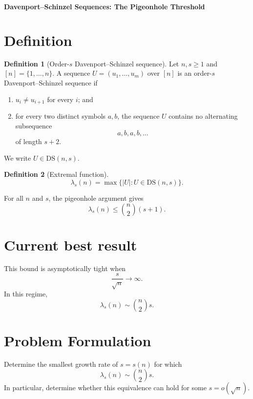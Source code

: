 \documentclass[11pt,a4paper]{article}
\theoremstyle{definition}
\newtheorem{definition}{Definition}
\begin{document}
\begin{center}
  {\Large\bfseries Davenport--Schinzel Sequences: The Pigeonhole Threshold}
\end{center}

\section{Definition}
\begin{definition}[Order-$s$ Davenport--Schinzel sequence]
Let $n,s\geq 1$ and $[n]=\{1,\ldots,n\}$. A sequence
$U=(u_1,\ldots,u_m)$ over $[n]$ is an order-$s$ Davenport--Schinzel sequence if
\begin{enumerate}
  \item $u_i\neq u_{i+1}$ for every $i$; and
  \item for every two distinct symbols $a,b$, the sequence $U$ contains no
  alternating subsequence
  \[
    a,b,a,b,\ldots
  \]
  of length $s+2$.
\end{enumerate}
We write $U\in\mathrm{DS}(n,s)$.
\end{definition}

\begin{definition}[Extremal function]
\begin{equation}
  \lambda_s(n)
  =\max\bigl\{|U|:U\in\mathrm{DS}(n,s)\bigr\}.
\end{equation}
\end{definition}

For all $n$ and $s$, the pigeonhole argument gives
\begin{equation}
  \lambda_s(n)\leq\binom{n}{2}(s+1).
\end{equation}

\section{Current best result}
This bound is asymptotically tight when
\begin{equation}
  \frac{s}{\sqrt n}\longrightarrow\infty.
\end{equation}
In this regime,
\begin{equation}
  \lambda_s(n)\sim\binom{n}{2}s.
\end{equation}

\section{Problem Formulation}

Determine the smallest growth rate of $s=s(n)$ for which
\begin{equation}
  \lambda_s(n)\sim\binom{n}{2}s.
\end{equation}
In particular, determine whether this equivalence can hold for some
$s=o(\sqrt n)$.
\end{document}
